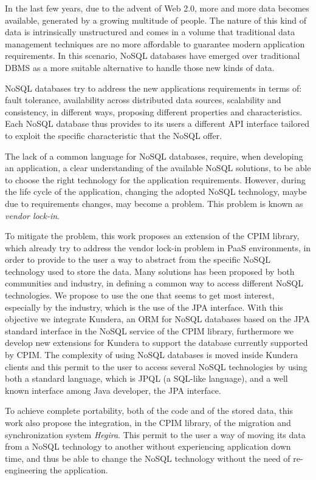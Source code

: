 In the last few years, due to the advent of Web 2.0, more and more data becomes available, generated by a growing multitude of people. The nature of this kind of data is intrinsically unstructured and comes in a volume that traditional data management techniques are no more affordable to guarantee modern application requirements.
In this scenario, NoSQL databases have emerged over traditional DBMS as a more suitable alternative to handle those new kinds of data.

\noindent NoSQL databases try to address the new applications requirements in terms of: fault tolerance, availability across distributed data sources, scalability and consistency, in different ways, proposing different properties and characteristics. 
Each NoSQL database thus provides to its users a different API interface tailored to exploit the specific characteristic that the NoSQL offer.

\noindent The lack of a common language for NoSQL databases, require, when developing an application, a clear understanding of the available NoSQL solutions, to be able to choose the right technology for the application requirements. However, during the life cycle of the application, changing the adopted NoSQL technology, maybe due to requirements changes, may become a problem. This problem is known as \textit{vendor lock-in}.  

\noindent To mitigate the problem, this work proposes an extension of the CPIM library, which already try to address the vendor lock-in problem in PaaS environments, in order to provide to the user a way to abstract from the specific NoSQL technology used to store the data.
Many solutions has been proposed by both communities and industry, in defining a common way to access different NoSQL technologies. We propose to use the one that seems to get most interest, especially by the industry, which is the use of the JPA interface. With this objective we integrate Kundera, an ORM for NoSQL databases based on the JPA standard interface in the NoSQL service of the CPIM library, furthermore we develop new extensions for Kundera to support the database currently supported by CPIM.
The complexity of using NoSQL databases is moved inside Kundera clients and this permit to the user to access several NoSQL technologies by using both a standard language, which is JPQL (a SQL-like language), and a well known interface among Java developer, the JPA interface.

\noindent To achieve complete portability, both of the code and of the stored data, this work also propose the integration, in the CPIM library, of the migration and synchronization system \textit{Hegira}. This permit to the user a way of moving its data from a NoSQL technology to another without experiencing application down time, and thus be able to change the NoSQL technology without the need of re-engineering the application.
 

